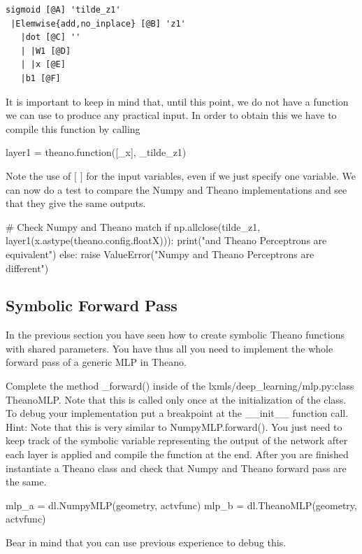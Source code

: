 \begin{exercise}
\begin{lstlisting}
sigmoid [@A] 'tilde_z1'
 |Elemwise{add,no_inplace} [@B] 'z1'
   |dot [@C] ''
   | |W1 [@D]
   | |x [@E]
   |b1 [@F]
\end{lstlisting}

It is important to keep in mind that, until this point, we do not have a
function we can use to produce any practical input. In order to obtain this we
have to compile this function by calling    
\begin{python}
layer1 = theano.function([_x], _tilde_z1)
\end{python}
Note the use of $[$ $]$ for the input variables, even if we just specify one
variable. We can now do a test to compare the Numpy and Theano implementations
and see that they give the same outputs.
\begin{python}
# Check Numpy and Theano match
if np.allclose(tilde_z1, layer1(x.astype(theano.config.floatX))):
    print("\nNumpy and Theano Perceptrons are equivalent")
else:
    raise ValueError("Numpy and Theano Perceptrons are different")
\end{python}
\end{exercise}

\subsection{Symbolic Forward Pass}
In the previous section you have seen how to create symbolic Theano functions
with shared parameters. You have thus all you need to implement the whole
forward pass of a generic MLP in Theano.
\begin{exercise}
Complete the method \_forward() inside of the lxmls/deep\_learning/mlp.py:class
TheanoMLP. Note that this is called only once at the initialization of the
class. To debug your implementation put a breakpoint at the \_\_init\_\_
function call. Hint: Note that this is very similar to NumpyMLP.forward().
You just need to keep track of the symbolic variable representing the output of
the network after each layer is applied and compile the function at the end.
After you are finished instantiate a Theano class and check that Numpy and
Theano forward pass are the same. 

\begin{python}
mlp_a = dl.NumpyMLP(geometry, actvfunc)
mlp_b = dl.TheanoMLP(geometry, actvfunc)
\end{python}

Bear in mind that you can use previous experience to debug this.

\end{exercise}

